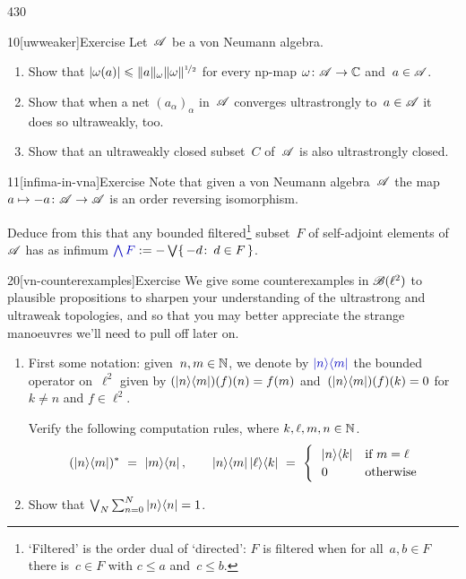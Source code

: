 \begin{parsec}{430}%
\begin{point}{10}[uwweaker]{Exercise}%
Let~$\scrA$ be a von Neumann algebra.
\begin{enumerate}
\item
Show that 
$\left|\omega(a)\right|\leq \|a\|_\omega \|\omega\|^{\nicefrac{1}{2}}$
for every np-map $\omega\colon \scrA\to\C$
and~$a\in\scrA$.
\item
Show that when a net $(a_\alpha)_\alpha$
in~$\scrA$ converges ultrastrongly to~$a\in \scrA$
it does so ultraweakly, too.
\item
Show that an ultraweakly closed subset~$C$ of~$\scrA$
is also ultrastrongly closed.
\end{enumerate}%
\spacingfix%
\end{point}%
\begin{point}{11}[infima-in-vna]{Exercise}%
Note that given a von Neumann algebra~$\scrA$
the map $a\mapsto -a\colon \scrA\to\scrA$ 
is an order reversing isomorphism.

Deduce from this that any bounded filtered\footnote{`Filtered' is the
order dual of `directed':
    $F$ is
filtered when
for all~$a,b\in F$ there is~$c\in F$ with $c\leq a$ and~$c\leq b$.}
subset~$F$
of self-adjoint elements of~$\scrA$
has as infimum $\Define{\bigwedge F} := -\bigvee\{\,-d\colon \,d\in F\,\}$.%
\end{point}
\begin{point}{20}[vn-counterexamples]{Exercise}%
We give some counterexamples in $\scrB(\ell^2)$
to plausible propositions
to sharpen your understanding of the ultrastrong and ultraweak topologies,
and so that you may better appreciate
the strange manoeuvres we'll need to pull off later on.
\begin{enumerate}
\item
First some notation: given~$n,m\in \N$,
we denote by $\Define{\ketbra{n}{m}}$%
the bounded operator on~$\ell^2$
given by $(\ketbra{n}{m})(f)(n)=f(m)$
and~$(\ketbra{n}{m})(f)(k)=0$ for $k\neq n$
and $f\in \ell^2$.

Verify the following computation rules,
where $k,\ell,m,n\in \N$.
\begin{equation*}
(\ketbra{n}{m})^*\ =\ \ketbra{m}{n},
\qquad
\ketbra{n}{m}\ketbra{\ell}{k}\ =\ 
\begin{cases}
\ \ \ketbra{n}{k} & \text{if $m=\ell$} \\
\ \ 0 & \text{otherwise}
\end{cases}
\end{equation*}
\item
Show that $\bigvee_N \sum_{n=0}^N \ketbra{n}{n}=1$.


\end{enumerate}
\end{point}
\end{parsec}
